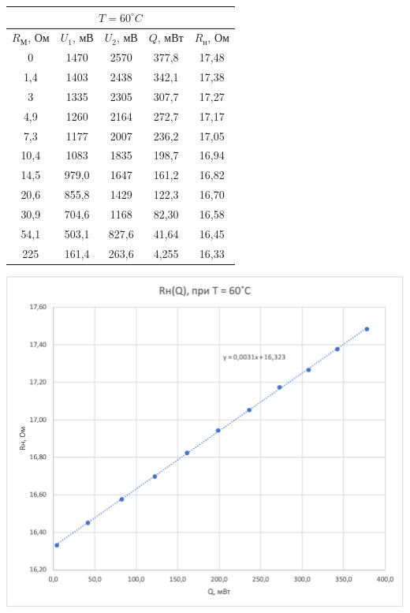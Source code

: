 \documentclass[a4paper, 12pt]{article}
\begin{document}
\begin{table}
        \vspace{1cm}
        
        \begin{minipage}[ht]{0.47\linewidth}
            \begin{tabular}{|c|c|c|c|c|}
                \hline
                \multicolumn{5}{|c|}{$T = 60^\circ C$} \\
                \hline
                $R_М$, Ом & $U_1$, мВ & $U_2$, мВ & $Q$, мВт & $R_н$, Ом \\
                \hline
                0 & 1470 & 2570 & 377,8 & 17,48 \\
                \hline
                1,4 & 1403 & 2438 & 342,1 & 17,38 \\
                \hline
                3 & 1335 & 2305 & 307,7 & 17,27 \\
                \hline
                4,9 & 1260 & 2164 & 272,7 & 17,17 \\
                \hline
                7,3 & 1177 & 2007 & 236,2 & 17,05 \\
                \hline
                10,4 & 1083 & 1835 & 198,7 & 16,94 \\
                \hline
                14,5 & 979,0 & 1647 & 161,2 & 16,82 \\
                \hline
                20,6 & 855,8 & 1429 & 122,3 & 16,70 \\
                \hline
                30,9 & 704,6 & 1168 & 82,30 & 16,58 \\
                \hline
                54,1 & 503,1 & 827,6 & 41,64 & 16,45 \\
                \hline
                225 & 161,4 & 263,6 & 4,255 & 16,33 \\
                \hline
            \end{tabular}
        \end{minipage}
        \hfill
        \begin{minipage}[ht]{0.47\linewidth}
            \includegraphics[width=\linewidth]{images/ch5.png}
        \end{minipage}
        

\end{table}
\end{document}
